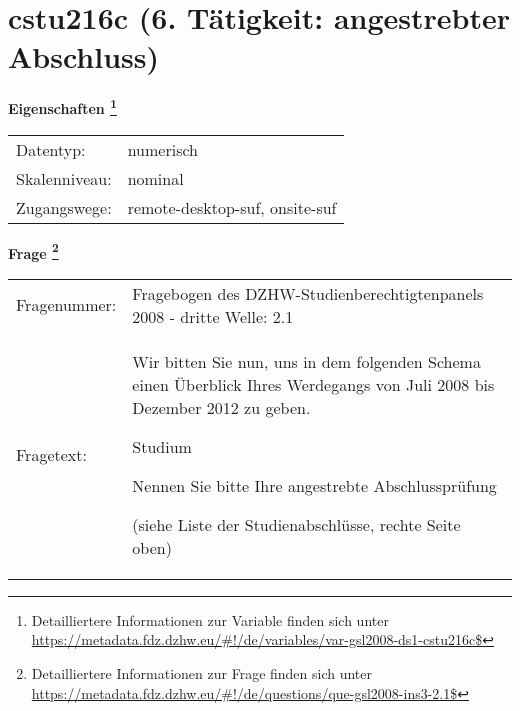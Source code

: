 
    \setcounter{footnote}{0}

    \vspace*{-1.8cm}
	\section{cstu216c (6. Tätigkeit: angestrebter Abschluss)}
	\label{section:cstu216c}



    \vspace*{0.5cm}
    \noindent\textbf{Eigenschaften
	\footnote{Detailliertere Informationen zur Variable finden sich unter
		\url{https://metadata.fdz.dzhw.eu/\#!/de/variables/var-gsl2008-ds1-cstu216c$}}}\\
	\begin{tabularx}{\hsize}{@{}lX}
	Datentyp: & numerisch \\
	Skalenniveau: & nominal \\
	Zugangswege: &
	  remote-desktop-suf, 
	  onsite-suf
 \\
    \end{tabularx}



				\vspace*{0.5cm}
                \noindent\textbf{Frage
	                \footnote{Detailliertere Informationen zur Frage finden sich unter
		              \url{https://metadata.fdz.dzhw.eu/\#!/de/questions/que-gsl2008-ins3-2.1$}}}\\
				\begin{tabularx}{\hsize}{@{}lX}
					Fragenummer: &
					  Fragebogen des DZHW-Studienberechtigtenpanels 2008 - dritte Welle:
					  2.1
 \\
					Fragetext: & Wir bitten Sie nun, uns in dem folgenden Schema einen Überblick Ihres Werdegangs von Juli 2008 bis Dezember 2012 zu geben.\par  Studium\par  Nennen Sie bitte Ihre angestrebte Abschlussprüfung \par  (siehe Liste der Studienabschlüsse, rechte Seite oben) \\
				\end{tabularx}





